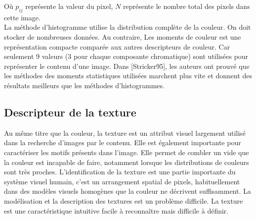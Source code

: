 Où $p_{ij}$ représente la valeur du pixel, $N$ représente le nombre total des pixels dans cette image.\\


La méthode d'histogramme utilise la distribution complète de la couleur. On doit stocker de nombreuses données. Au contraire, Les moments de couleur est une représentation compacte comparée aux autres descripteurs de couleur. Car seulement 9 valeurs (3 pour chaque composante chromatique) sont utilisées pour représenter le contenu d'une image. Dans [Stricker95], les auteurs ont prouvé que les méthodes des moments statistiques utilisées marchent plus vite et donnent des résultats meilleurs que les méthodes d’histogrammes.\\


%
%

\subsection{Descripteur de la texture}
Au même titre que la couleur, la texture est un  attribut visuel largement utilisé dans la recherche d’images par le contenu. Elle est également importante pour caractériser les motifs présents dans l’image. Elle permet de combler un vide que la couleur est incapable de faire, notamment lorsque les distributions de couleurs sont très proches. L'identification de la texture est une partie importante du système visuel humain, c'est un arrangement spatial de pixels, habituellement dans des modèles visuels homogènes que la couleur ne décrivent suffisamment. La modélisation et la description des textures est un problème difficile. La texture est une caractéristique intuitive facile à reconnaître mais difficile à définir.

